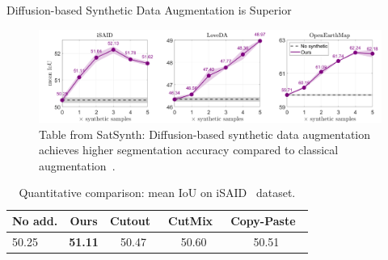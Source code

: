   \begin{refsection}
    \begin{frame}{Diffusion-based Synthetic Data Augmentation is Superior}
      \begin{figure}
        \centering
        \includegraphics[width=0.7\linewidth]{figs/satsynth_comparison.png}
        \caption{\scriptsize Table from SatSynth: Diffusion-based synthetic data augmentation achieves higher segmentation accuracy compared to classical augmentation~\parencite{tokerSatSynthAugmentingImageMask2024}.}
      \end{figure}
      \vspace{-2.5em}
      \begin{table}[]
        \centering
        \caption[]{\scriptsize Quantitative comparison: mean IoU on iSAID~\parencite{waqas2019isaid} dataset.}
        \scriptsize
        \setlength{\tabcolsep}{2.5pt}
        \begin{tabular}{@{}l|cccc@{}}
        \toprule
        \textbf{No add.} & \textbf{Ours} & \textbf{Cutout~\parencite{devriesImprovedRegularizationConvolutional2017}} & \textbf{CutMix~\parencite{yunCutmixRegularizationStrategy2019}} & \textbf{Copy-Paste~\parencite{ghiasiSimpleCopyPasteStrong2021}} \\
        \midrule
        50.25 & \textbf{51.11} & 50.47 & 50.60 & 50.51 \\
        \bottomrule
        \end{tabular}
      \end{table}
    
      \bottomleftrefs
    \end{frame}
    \end{refsection}
    
